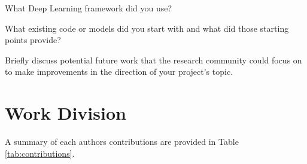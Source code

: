 \documentclass[10pt,twocolumn,letterpaper]{article}
\begin{document}
What Deep Learning framework did you use? 

What existing code or models did you start with and what did those starting points provide? 

Briefly discuss potential future work that the research community could focus on to make improvements in the direction of your project's topic.



\section{Work Division}

A summary of each authors contributions are provided in Table \ref{tab:contributions}.








\end{document}

